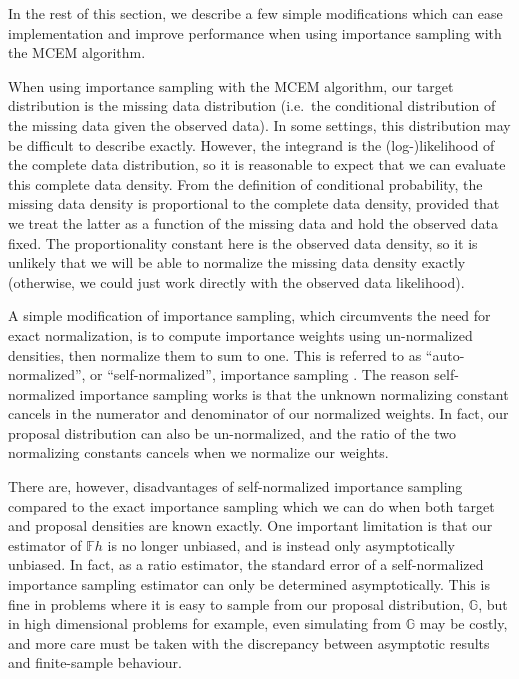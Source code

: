 \documentclass[11pt, oneside]{article}   	%
\newcommand{\bF}{\mathbb{F}}
\newcommand{\bG}{\mathbb{G}}
\begin{document}
In the rest of this section, we describe a few simple modifications which can ease implementation and improve performance when using importance sampling with the MCEM algorithm.

When using importance sampling with the MCEM algorithm, our target distribution is the missing data distribution (i.e.\ the conditional distribution of the missing data given the observed data). In some settings, this distribution may be difficult to describe exactly. However, the integrand is the (log-)likelihood of the complete data distribution, so it is reasonable to expect that we can evaluate this complete data density. From the definition of conditional probability, the missing data density is proportional to the complete data density, provided that we treat the latter as a function of the missing data and hold the observed data fixed. The proportionality constant here is the observed data density, so it is unlikely that we will be able to normalize the missing data density exactly (otherwise, we could just work directly with the observed data likelihood). 

A simple modification of importance sampling, which circumvents the need for exact normalization, is to compute importance weights using un-normalized densities, then normalize them to sum to one. This is referred to as ``auto-normalized'', or ``self-normalized'', importance sampling \citep[see, e.g.,][]{Elv22}. The reason self-normalized importance sampling works is that the unknown normalizing constant cancels in the numerator and denominator of our normalized weights. In fact, our proposal distribution can also be un-normalized, and the ratio of the two normalizing constants cancels when we normalize our weights.

There are, however, disadvantages of self-normalized importance sampling compared to the exact importance sampling which we can do when both target and proposal densities are known exactly. One important limitation is that our estimator of $\bF h$ is no longer unbiased, and is instead only asymptotically unbiased. In fact, as a ratio estimator, the standard error of a self-normalized importance sampling estimator can only be determined asymptotically. This is fine in problems where it is easy to sample from our proposal distribution, $\bG$, but in high dimensional problems for example, even simulating from $\bG$ may be costly, and more care must be taken with the discrepancy between asymptotic results and finite-sample behaviour.
\end{document}
